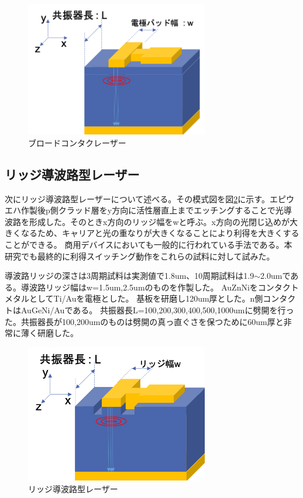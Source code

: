 \begin{figure}[h]
	\centering
	\includegraphics[width=8cm]{figure/fig_2_1_broadcontact.png}
	\caption{ブロードコンタクレーザー}
	\label{fig:sample_broadcontact}
\end{figure}

\subsection{リッジ導波路型レーザー}%
次にリッジ導波路型レーザーについて述べる。その模式図を図\ref{fig_2_1_ridge}に示す。エピウエハ作製後p側クラッド層をy方向に活性層直上までエッチングすることで光導波路を形成した。そのときx方向のリッジ幅をwと呼ぶ。x方向の光閉じ込めが大きくなるため、キャリアと光の重なりが大きくなることにより利得を大きくすることができる。%
商用デバイスにおいても一般的に行われている手法である。本研究でも最終的に利得スイッチング動作をこれらの試料に対して試みた。

導波路リッジの深さは3周期試料は実測値で1.8um、10周期試料は1.9$\sim$2.0umである。導波路リッジ幅はw=1.5um,2.5umのものを作製した。
AuZnNiをコンタクトメタルとしてTi/Auを電極とした。
基板を研磨し120um厚とした。n側コンタクトはAuGeNi/Auである。
共振器長L=100,200,300,400,500,1000umに劈開を行った。共振器長が100,200umのものは劈開の真っ直ぐさを保つために60um厚と非常に薄く研磨した。
\begin{figure}[h]
	\centering
	\includegraphics[width=8cm]{figure/fig_2_1_ridge.png}
	\caption{リッジ導波路型レーザー}
	\label{fig_2_1_ridge}
\end{figure}

